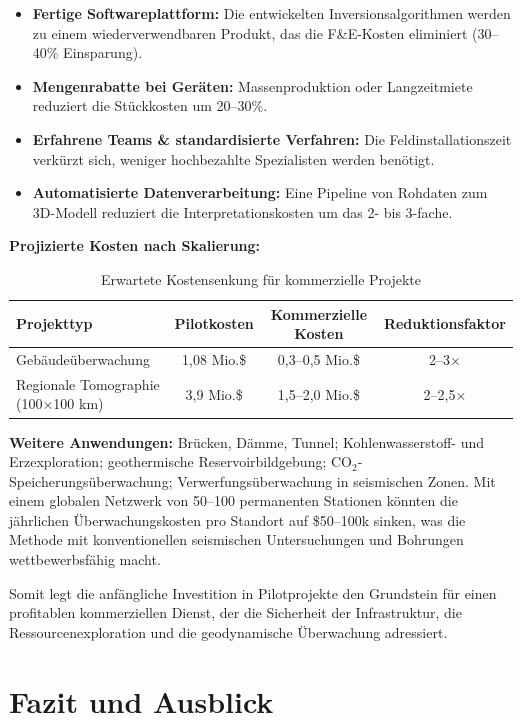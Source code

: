 \documentclass[12pt,a4paper]{article}
\theoremstyle{remark}
\begin{document}
	\begin{itemize}
		\item \textbf{Fertige Softwareplattform:} Die entwickelten Inversionsalgorithmen werden zu einem wiederverwendbaren Produkt, das die F\&E-Kosten eliminiert (30–40\% Einsparung).
		\item \textbf{Mengenrabatte bei Geräten:} Massenproduktion oder Langzeitmiete reduziert die Stückkosten um 20–30\%.
		\item \textbf{Erfahrene Teams \& standardisierte Verfahren:} Die Feldinstallationszeit verkürzt sich, weniger hochbezahlte Spezialisten werden benötigt.
		\item \textbf{Automatisierte Datenverarbeitung:} Eine Pipeline von Rohdaten zum 3D-Modell reduziert die Interpretationskosten um das 2- bis 3-fache.
	\end{itemize}
	
	\textbf{Projizierte Kosten nach Skalierung:}
	
	\begin{table}[htbp]
		\centering
		\caption{Erwartete Kostensenkung für kommerzielle Projekte}
		\label{tab:scaling}
		\begin{tabular}{lccc}
			\toprule
			\textbf{Projekttyp} & \textbf{Pilotkosten} & \textbf{Kommerzielle Kosten} & \textbf{Reduktionsfaktor} \\
			\midrule
			Gebäudeüberwachung & 1,08 Mio.\$ & 0,3–0,5 Mio.\$ & 2–3× \\
			Regionale Tomographie (100×100 km) & 3,9 Mio.\$ & 1,5–2,0 Mio.\$ & 2–2,5× \\
			\bottomrule
		\end{tabular}
	\end{table}
	
	\textbf{Weitere Anwendungen:} Brücken, Dämme, Tunnel; Kohlenwasserstoff- und Erzexploration; geothermische Reservoirbildgebung; CO$_2$-Speicherungsüberwachung; Verwerfungsüberwachung in seismischen Zonen. Mit einem globalen Netzwerk von 50–100 permanenten Stationen könnten die jährlichen Überwachungskosten pro Standort auf \$50–100k sinken, was die Methode mit konventionellen seismischen Untersuchungen und Bohrungen wettbewerbsfähig macht.
	
	Somit legt die anfängliche Investition in Pilotprojekte den Grundstein für einen profitablen kommerziellen Dienst, der die Sicherheit der Infrastruktur, die Ressourcenexploration und die geodynamische Überwachung adressiert.
	
	\section{Fazit und Ausblick}
	\label{sec:conclusion}
	
\end{document}

